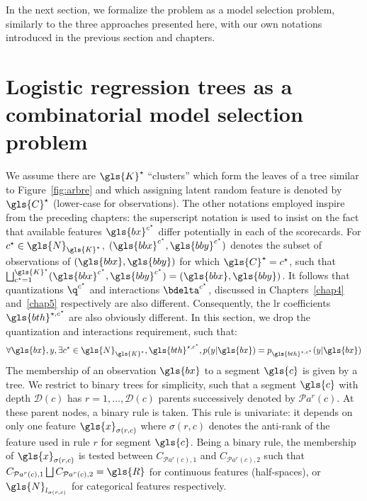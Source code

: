 In the next section, we formalize the problem as a model selection problem, similarly to the three approaches presented here, with our own notations introduced in the previous section and chapters.


\section{Logistic regression trees as a combinatorial model selection problem} \label{sec:model_selec_tree}

We assume there are $\gls{K}^\star$ ``clusters'' which form the leaves of a tree similar to Figure~\ref{fig:arbre} and which assigning latent random feature is denoted by $\gls{C}^\star$ (lower-case for observations). The other notations employed inspire from the preceding chapters: the superscript notation is used to insist on the fact that available features $\gls{bx}^{c^\star}$ differ potentially in each of the scorecards. For $c^\star \in \gls{N}_{\gls{K}^\star}$, $(\gls{bbx}^{c^\star}, \gls{bby}^{c^\star})$ denotes the subset of observations of $(\gls{bbx}, \gls{bby})$ for which $\gls{C}^\star = c^\star$, such that $ \bigsqcup_{c^\star=1}^{\gls{K}^\star} (\gls{bbx}^{c^\star}, \gls{bby}^{c^\star}) = (\gls{bbx}, \gls{bby})$. It follows that quantizations $\q^{c^\star}$ and interactions $\bdelta^{c^\star}$, discussed in Chapters~\ref{chap4} and~\ref{chap5} respectively are also different. Consequently, the \gls{lr} coefficients $\gls{bth}^{\star,c^\star}$ are also obviously different. In this section, we drop the quantization and interactions requirement, such that:
\begin{equation} \label{eq:lr_tree}
\forall \gls{bx}, y, \exists c^\star \in \gls{N}_{\gls{K}^\star}, \gls{bth}^{\star,c^\star}, p(y | \gls{bx}) = p_{\gls{bth}^{\star,c^\star}}(y | \gls{bx})
\end{equation}
The membership of an observation $\gls{bx}$ to a segment $\gls{c}$ is given by a tree. We restrict to binary trees for simplicity, such that a segment $\gls{c}$ with depth $\mathcal{D}(c)$ has $r = 1, \dots, \mathcal{D}(c)$ parents successively denoted by $\mathcal{P}a^r(c)$. At these parent nodes, a binary rule is taken. This rule is univariate: it depends on only one feature $\gls{x}_{\sigma(r,c)}$ where $\sigma(r,c)$ denotes the anti-rank of the feature used in rule $r$ for segment $\gls{c}$. Being a binary rule, the membership of $\gls{x}_{\sigma(r,c)}$ is tested between $C_{\mathcal{P}a^r(c),1}$ and $C_{\mathcal{P}a^r(c),2}$ such that $C_{\mathcal{P}a^r(c),1} \bigsqcup C_{\mathcal{P}a^r(c),2} =\gls{R}$ for continuous features (half-spaces), or $\gls{N}_{l_{\sigma(r,c)}}$ for categorical features respectively. 
